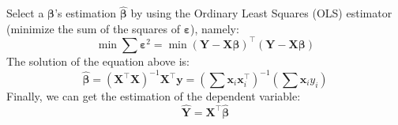 \begin{enumerate}
Select a $\boldsymbol{\beta}$'s estimation $\hat{\boldsymbol{\beta}}$ by using the Ordinary Least Squares (OLS) estimator (minimize the sum of the squares of $\boldsymbol{\varepsilon}$), namely:
\begin{equation}
    \min{\sum{\boldsymbol{\varepsilon}^2}} = \min{(\mathbf{Y}-\mathbf{X}\boldsymbol{\beta})^{\top}(\mathbf{Y}-\mathbf{X}\boldsymbol{\beta})}
\end{equation}
The solution of the equation above is:
\begin{equation}
    {\displaystyle {\hat {\boldsymbol {\beta }}}=(\mathbf {X} ^{\top }\mathbf {X} )^{-1}\mathbf {X} ^{\top }\mathbf {y} =\left(\sum \mathbf {x} _{i}\mathbf {x} _{i}^{\top }\right)^{-1}\left(\sum \mathbf {x} _{i}y_{i}\right)}
\end{equation}
Finally, we can get the estimation of the dependent variable:
\begin{equation}
    \hat{\mathbf{Y}} = \mathbf{X}^{\top} \hat{\boldsymbol{\beta}}
\end{equation}


\end{enumerate}
